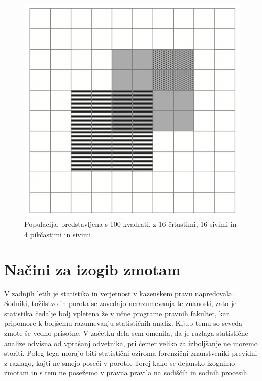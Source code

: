 \documentclass[fin1, tisk]{fmfdelo}
\theoremstyle{definition}
\theoremstyle{trditev}
\theoremstyle{izrek}
\begin{document}
\begin{figure}[!ht]\label{fig:slika2}
   \centering
   \includegraphics[scale=0.45]{slika2.png}
   \caption{Populacija, predstavljena s 100 kvadrati, z 16 črtastimi, 16 sivimi in 4 pikčastimi in sivimi.}\vspace{2mm}
\end{figure}

\section{Načini za izogib zmotam}
V zadnjih letih je statistika in verjetnost v kazenskem pravu napredovala. Sodniki, tožilstvo in porota se zavedajo nerazumevanja te znanosti, zato 
je statistika čedalje bolj vpletena že v učne programe pravnih fakultet, kar pripomore k boljšemu razumevanju statističnih analiz. Kljub temu so seveda 
zmote še vedno prisotne. V začetku dela sem omenila, da je razlaga statistične analize odvisna od vprašanj odvetnika, pri čemer veliko za izboljšanje 
ne moremo storiti. Poleg tega morajo biti statistični oziroma forenzični znanstveniki previdni z razlago, kajti ne smejo poseči v poroto. Torej kako 
se dejansko izognimo zmotam in s tem ne posežemo v pravna pravila na sodiščih in sodnih procesih.
\end{document}
